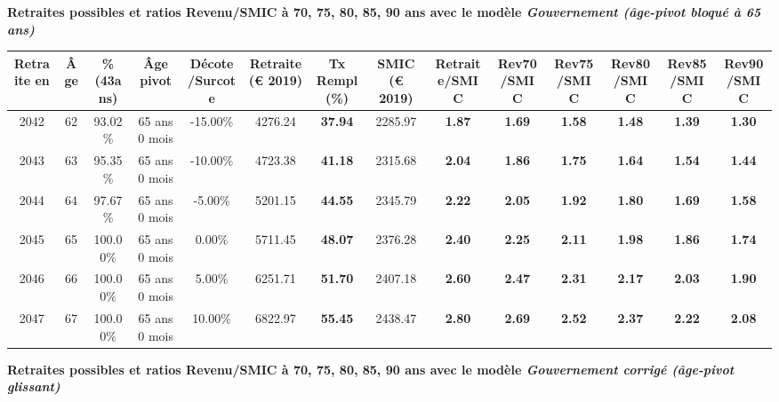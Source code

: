 {\bf \noindent Retraites possibles et ratios Revenu/SMIC à 70, 75, 80, 85, 90 ans avec le modèle \emph{Gouvernement (âge-pivot bloqué à 65 ans)}}  
 
\begin{adjustbox}{max width=\textwidth} 
\begin{tabular}[htb]{|c|c||c|c|c||c|c||c||c|c|c|c|c|c|} 
\hline 
 Retraite en &  Âge &  \%(43ans) &  Âge pivot &  Décote/Surcote &  Retraite (\euro{} 2019) &  Tx Rempl(\%) &  SMIC (\euro{} 2019) &  Retraite/SMIC &  Rev70/SMIC &  Rev75/SMIC &  Rev80/SMIC &  Rev85/SMIC &  Rev90/SMIC \\ 
\hline \hline 
 2042 &  62 &  93.02\% &  65 ans 0 mois &  -15.00\% &  4276.24 &  {\bf 37.94} &  2285.97 &  {\bf 1.87} &  {\bf 1.69} &  {\bf 1.58} &  {\bf 1.48} &  {\bf 1.39} &  {\bf 1.30} \\ 
\hline 
 2043 &  63 &  95.35\% &  65 ans 0 mois &  -10.00\% &  4723.38 &  {\bf 41.18} &  2315.68 &  {\bf 2.04} &  {\bf 1.86} &  {\bf 1.75} &  {\bf 1.64} &  {\bf 1.54} &  {\bf 1.44} \\ 
\hline 
 2044 &  64 &  97.67\% &  65 ans 0 mois &  -5.00\% &  5201.15 &  {\bf 44.55} &  2345.79 &  {\bf 2.22} &  {\bf 2.05} &  {\bf 1.92} &  {\bf 1.80} &  {\bf 1.69} &  {\bf 1.58} \\ 
\hline 
 2045 &  65 &  100.00\% &  65 ans 0 mois &  0.00\% &  5711.45 &  {\bf 48.07} &  2376.28 &  {\bf 2.40} &  {\bf 2.25} &  {\bf 2.11} &  {\bf 1.98} &  {\bf 1.86} &  {\bf 1.74} \\ 
\hline 
 2046 &  66 &  100.00\% &  65 ans 0 mois &  5.00\% &  6251.71 &  {\bf 51.70} &  2407.18 &  {\bf 2.60} &  {\bf 2.47} &  {\bf 2.31} &  {\bf 2.17} &  {\bf 2.03} &  {\bf 1.90} \\ 
\hline 
 2047 &  67 &  100.00\% &  65 ans 0 mois &  10.00\% &  6822.97 &  {\bf 55.45} &  2438.47 &  {\bf 2.80} &  {\bf 2.69} &  {\bf 2.52} &  {\bf 2.37} &  {\bf 2.22} &  {\bf 2.08} \\ 
\hline 
\hline 
\end{tabular} 
\end{adjustbox} 
 
 \vspace{0.1cm} 
{\bf \noindent Retraites possibles et ratios Revenu/SMIC à 70, 75, 80, 85, 90 ans avec le modèle \emph{Gouvernement corrigé (âge-pivot glissant)}}  
 
